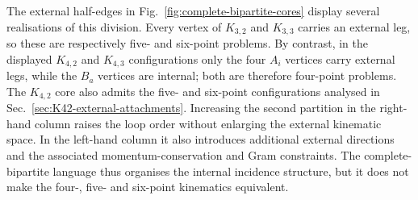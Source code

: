 \documentclass[a4paper,11pt]{article}
\begin{document}
The external half-edges in Fig.~\ref{fig:complete-bipartite-cores} display
several realisations of this division.  Every vertex of \(K_{3,2}\) and
\(K_{3,3}\) carries an external leg, so these are respectively five- and
six-point problems.  By contrast, in the displayed \(K_{4,2}\) and
\(K_{4,3}\) configurations only the four \(A_i\) vertices carry external legs,
while the \(B_a\) vertices are internal; both are therefore four-point
problems.  The \(K_{4,2}\) core also admits the five- and six-point
configurations analysed in Sec.~\ref{sec:K42-external-attachments}.
Increasing the second partition in the right-hand column raises the loop
order without enlarging the external kinematic space.  In the left-hand
column it also introduces additional external directions and the associated
momentum-conservation and Gram constraints.  The complete-bipartite language
thus organises the internal incidence structure, but it does not make the
four-, five- and six-point kinematics equivalent.
\end{document}

